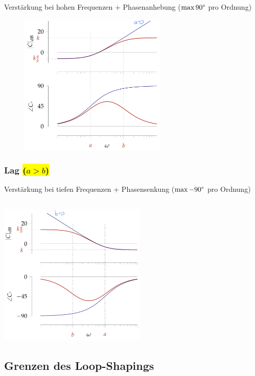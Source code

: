 \documentclass[
  10pt,
  a4paper,
  twocolumn]{article}
\numberwithin{equation}{section}
\begin{document}
Verstärkung bei hohen Frequenzen + Phasenanhebung (\(\max 90\degree\)
pro Ordnung)

\begin{figure}[H]

{\centering \includegraphics[width=7cm,height=\textheight]{images/paste-79.png}

}

\end{figure}

\hypertarget{lag}{%
\subsubsection{\texorpdfstring{Lag \hl{($a > b$)}}{Lag }}\label{lag}}

Verstärkung bei tiefen Frequenzen + Phasensenkung (\(\max -90\degree\)
pro Ordnung)

\hypertarget{section}{%
\subsection{\texorpdfstring{\protect\includegraphics[width=7cm,height=\textheight]{images/paste-80.png}}{}}\label{section}}

\hypertarget{grenzen-des-loop-shapings}{%
\subsection{Grenzen des Loop-Shapings}\label{grenzen-des-loop-shapings}}
\end{document}
